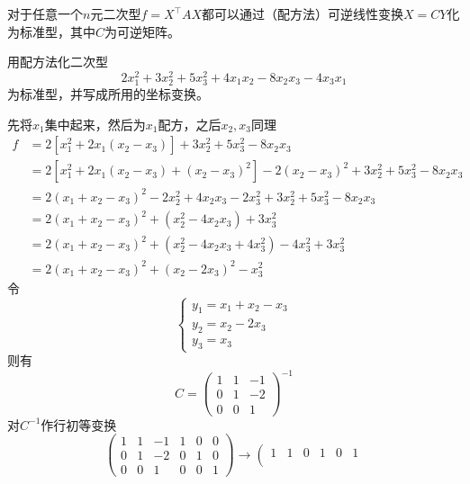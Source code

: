 \begin{theorem}
    对于任意一个$n$元二次型$f=X^\intercal A X$都可以通过（配方法）可逆线性变换$X=CY$化为标准型，其中$C$为可逆矩阵。
\end{theorem}
\begin{example}
    用配方法化二次型
    \[ 2x_1^2 + 3x_2^2 + 5x_3^2 + 4x_1x_2 - 8x_2x_3 - 4x_3x_1 \]
    为标准型，并写成所用的坐标变换。
\end{example}
\begin{solution}
    先将$x_1$集中起来，然后为$x_1$配方，之后$x_2,x_3$同理
    \begin{align*}
        f & = 2[x_1^2 + 2x_1(x_2-x_3)] + 3x_2^2 + 5x_3^2 -8x_2x_3                              \\
          & = 2[x_1^2 + 2x_1(x_2-x_3) + (x_2-x_3)^2] - 2(x_2-x_3)^2 + 3x_2^2 + 5x_3^2 -8x_2x_3 \\
          & = 2(x_1+x_2-x_3)^2 - 2x_2^2 + 4x_2x_3 - 2x_3^2 + 3x_2^2 + 5x_3^2 -8x_2x_3          \\
          & = 2(x_1+x_2-x_3)^2 + (x_2^2-4x_2x_3) + 3x_3^2                                      \\
          & = 2(x_1+x_2-x_3)^2 + (x_2^2-4x_2x_3 +4x_3^2) - 4x_3^2 + 3x_3^2                     \\
          & = 2(x_1+x_2-x_3)^2 + (x_2-2x_3)^2 - x_3^2
    \end{align*}
    令
    \[
        \begin{cases}
            y_1 = x_1+x_2-x_3 \\
            y_2 = x_2-2x_3    \\
            y_3 = x_3
        \end{cases}
    \]
    则有
    \[
        C  =
        \begin{pmatrix}
            1 & 1 & -1 \\
            0 & 1 & -2 \\
            0 & 0 & 1
        \end{pmatrix}^{-1}
    \]
    对$C^{-1}$作行初等变换
    \[
        \left(\begin{array}{ccc|ccc}
                1 & 1 & -1 & 1 & 0 & 0 \\
                0 & 1 & -2 & 0 & 1 & 0 \\
                0 & 0 & 1  & 0 & 0 & 1
            \end{array}\right)
        \longrightarrow
        \left(\begin{array}{ccc|ccc}
                1 & 1 & 0 & 1 & 0 & 1 \\

\end{array}\]
\end{solution}
